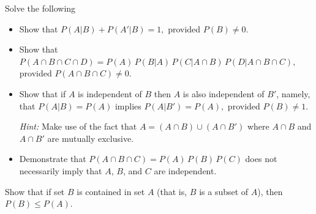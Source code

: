 \begin{Ejer} Solve the following
\begin{itemize}
\item[a) ] Show that $P(A|B) + P(A'|B) = 1,$ provided $P(B) \neq 0$.

\item[b) ] Show that $P(A \cap B \cap C \cap D)= P(A)\,P(B|A)\,P(C|A \cap B)\,P(D|A \cap B \cap C),$ provided $P(A \cap B \cap C) \neq 0$.

\item[c) ] Show that if $A$ is independent of $B$ then $A$ is also independent of $B'$, namely, that $P(A|B)=P(A)$ implies $P(A|B')=P(A),$ provided $P(B)\neq1$. 

\textit{Hint:} Make use of the fact that
$A=(A\cap B)\cup(A\cap B')$ where $A\cap B$ and $A\cap B'$ are mutually exclusive.

\item[d) ] Demonstrate that $P(A\cap B\cap C)=P(A)\,P(B)\,P(C)$ does not necessarily imply that $A$, $B$, and $C$ are independent.

\end{itemize}
\end{Ejer}

\begin{Ejer} Show that if set $B$ is contained in set $A$ (that is, $B$ is a subset of $A$), then
$P(B)\le P(A).$

\end{Ejer}


